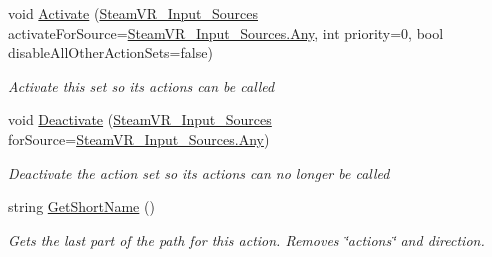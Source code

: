 \begin{DoxyCompactItemize}
void \mbox{\hyperlink{interface_valve_1_1_v_r_1_1_i_steam_v_r___action_set_ad7a3807ce56c1ace0e0dba9c666380c4}{Activate}} (\mbox{\hyperlink{namespace_valve_1_1_v_r_a82e5bf501cc3aa155444ee3f0662853f}{Steam\+V\+R\+\_\+\+Input\+\_\+\+Sources}} activate\+For\+Source=\mbox{\hyperlink{namespace_valve_1_1_v_r_a82e5bf501cc3aa155444ee3f0662853faed36a1ef76a59ee3f15180e0441188ad}{Steam\+V\+R\+\_\+\+Input\+\_\+\+Sources.\+Any}}, int priority=0, bool disable\+All\+Other\+Action\+Sets=false)
\begin{DoxyCompactList}\small\item\em Activate this set so its actions can be called \end{DoxyCompactList}\item 
void \mbox{\hyperlink{interface_valve_1_1_v_r_1_1_i_steam_v_r___action_set_a7f2befeb3e536b020c6a9a72ac16597b}{Deactivate}} (\mbox{\hyperlink{namespace_valve_1_1_v_r_a82e5bf501cc3aa155444ee3f0662853f}{Steam\+V\+R\+\_\+\+Input\+\_\+\+Sources}} for\+Source=\mbox{\hyperlink{namespace_valve_1_1_v_r_a82e5bf501cc3aa155444ee3f0662853faed36a1ef76a59ee3f15180e0441188ad}{Steam\+V\+R\+\_\+\+Input\+\_\+\+Sources.\+Any}})
\begin{DoxyCompactList}\small\item\em Deactivate the action set so its actions can no longer be called \end{DoxyCompactList}\item 
string \mbox{\hyperlink{interface_valve_1_1_v_r_1_1_i_steam_v_r___action_set_a695b72b2db2413a2ee8b7b2797f83240}{Get\+Short\+Name}} ()
\begin{DoxyCompactList}\small\item\em Gets the last part of the path for this action. Removes \char`\"{}actions\char`\"{} and direction. \end{DoxyCompactList}\end{DoxyCompactItemize}

